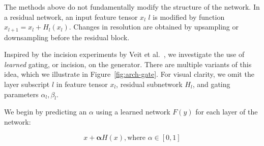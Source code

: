 The methods above do not fundamentally modify the structure of the network. In a residual network, an input feature tensor $x_l$ $l$ is modified by function $x_{l+1} = x_l+H_l(x_l)$. Changes in resolution are obtained by upsampling or downsampling before the residual block.


Inspired by the incision experiments by Veit et al.~\cite{veit2016residual,veit2018adaptive}, we investigate the use of \textit{learned} gating, or incision, on the generator. There are multiple variants of this idea, which we illustrate in Figure~\ref{fig:arch-gate}. For visual clarity, we omit the layer subscript $l$ in feature tensor $x_l$, residual subnetwork $H_l$, and gating parameters $\alpha_l, \beta_l$.

We begin by predicting an $\alpha$ using a learned network $F(y)$ for each layer of the network:

\begin{equation}
x + \mathbf{\alpha} H(x), \text{where } \alpha \in [0,1]
\end{equation}

